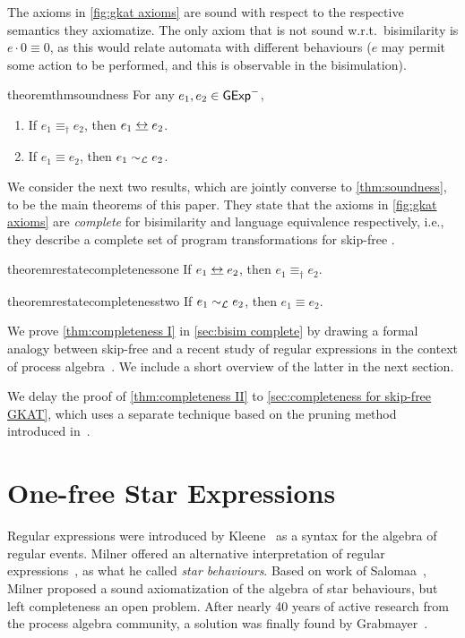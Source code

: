 \documentclass[orivec,envcountsect,envcountsame]{llncs}
\begin{document}
    The axioms in \cref{fig:gkat axioms} are sound with respect to the respective semantics they axiomatize.
    The only axiom that is not sound w.r.t.\ bisimilarity is $e\cdot 0\equiv 0$, as this would relate automata with different behaviours ($e$ may permit some action to be performed, and this is observable in the bisimulation).
    \begin{restatable}[Soundness]{theorem}{thmsoundness}\label{thm:soundness}
        For any \(e_1, e_2 \in \mathsf{GExp}^-\),
        \begin{enumerate}
            \item If \(e_1 \equiv_\dagger e_2\), then \(e_1 \bisim e_2\).
            \item If \(e_1 \equiv e_2\), then \(e_1 \sim_{\mathcal{L}} e_2\).
        \end{enumerate}
    \end{restatable}

    We consider the next two results, which are jointly converse to \cref{thm:soundness}, to be the main theorems of this paper.
    They state that the axioms in \cref{fig:gkat axioms} are \emph{complete} for bisimilarity and language equivalence respectively, i.e., they describe a complete set of program transformations for skip-free  \GKAT. %

    \begin{restatable}[Completeness I]{theorem}{restatecompletenessone}\label{thm:completeness I}
        If \(e_1 \bisim e_2\), then \(e_1 \equiv_\dagger e_2\).
    \end{restatable}
    \begin{restatable}[Completeness II]{theorem}{restatecompletenesstwo}\label{thm:completeness II}
        If \(e_1 \sim_{\mathcal{L}} e_2\), then \(e_1 \equiv e_2\).
    \end{restatable}

    We prove \cref{thm:completeness I} in \cref{sec:bisim complete} by drawing a formal analogy between skip-free \GKAT and a recent study of regular expressions in the context of process algebra~\cite{onefreeregexlics}.
    We include a short overview of the latter in the next section.

    We delay the proof of \cref{thm:completeness II} to \cref{sec:completeness for skip-free GKAT}, which uses a separate technique based on the pruning method introduced in~\cite{gkaticalp}.

\section{One-free Star Expressions}\label{sec:regexp}
    Regular expressions were introduced by Kleene~\cite{kleene} as a syntax for the algebra of regular events.
    Milner offered an alternative interpretation of regular expressions~\cite{milner}, as what he called \emph{star behaviours}.
    Based on work of Salomaa~\cite{salomaa}, Milner proposed a sound axiomatization of the algebra of star behaviours, but left completeness an open problem.
    After nearly 40 years of active research from the process algebra community, a solution was finally found by Grabmayer~\cite{regexlics}.
\end{document}
